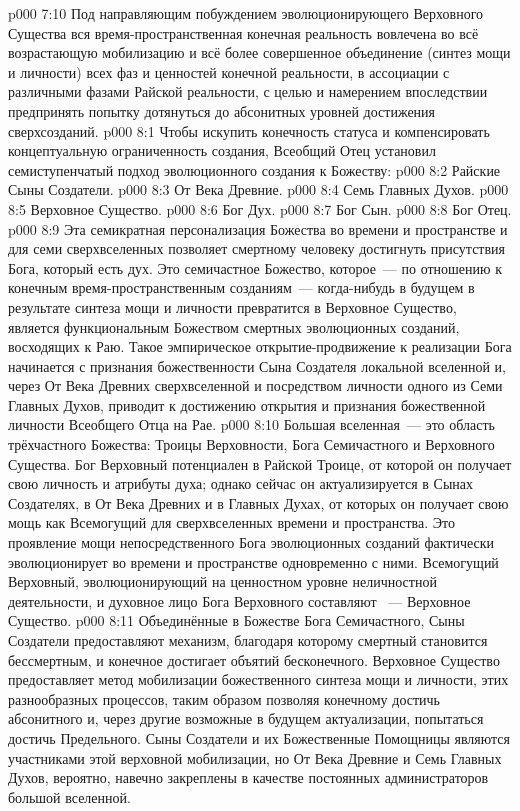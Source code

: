\vs p000 7:10 Под направляющим побуждением эволюционирующего Верховного Существа вся время\hyp{}пространственная конечная реальность вовлечена во всё возрастающую мобилизацию и всё более совершенное объединение (синтез мощи и личности) всех фаз и ценностей конечной реальности, в ассоциации с различными фазами Райской реальности, с целью и намерением впоследствии предпринять попытку дотянуться до абсонитных уровней достижения сверхсозданий.
\vs p000 8:1 Чтобы искупить конечность статуса и компенсировать концептуальную ограниченность создания, Всеобщий Отец установил семиступенчатый подход эволюционного создания к Божеству:
\vs p000 8:2 Райские Сыны Создатели.
\vs p000 8:3 От Века Древние.
\vs p000 8:4 Семь Главных Духов.
\vs p000 8:5 Верховное Существо.
\vs p000 8:6 Бог Дух.
\vs p000 8:7 Бог Сын.
\vs p000 8:8 Бог Отец.
\vs p000 8:9 \pc Эта семикратная персонализация Божества во времени и пространстве и для семи сверхвселенных позволяет смертному человеку достигнуть присутствия Бога, который есть дух. Это семичастное Божество, которое~--- по отношению к конечным время\hyp{}пространственным созданиям~--- когда\hyp{}нибудь в будущем в результате синтеза мощи и личности превратится в Верховное Существо, является функциональным Божеством смертных эволюционных созданий, восходящих к Раю. Такое эмпирическое открытие\hyp{}продвижение к реализации Бога начинается с признания божественности Сына Создателя локальной вселенной и, через От Века Древних сверхвселенной и посредством личности одного из Семи Главных Духов, приводит к достижению открытия и признания божественной личности Всеобщего Отца на Рае.
\vs p000 8:10 \pc Большая вселенная~--- это область трёхчастного Божества: Троицы Верховности, Бога Семичастного и Верховного Существа. Бог Верховный потенциален в Райской Троице, от которой он получает свою личность и атрибуты духа; однако сейчас он актуализируется в Сынах Создателях, в От Века Древних и в Главных Духах, от которых он получает свою мощь как Всемогущий для сверхвселенных времени и пространства. Это проявление мощи непосредственного Бога эволюционных созданий фактически эволюционирует во времени и пространстве одновременно с ними. Всемогущий Верховный, эволюционирующий на ценностном уровне неличностной деятельности, и духовное лицо Бога Верховного составляют ~--- Верховное Существо.
\vs p000 8:11 Объединённые в Божестве Бога Семичастного, Сыны Создатели предоставляют механизм, благодаря которому смертный становится бессмертным, и конечное достигает объятий бесконечного. Верховное Существо предоставляет метод мобилизации божественного синтеза мощи и личности,  этих разнообразных процессов, таким образом позволяя конечному достичь абсонитного и, через другие возможные в будущем актуализации, попытаться достичь Предельного. Сыны Создатели и их Божественные Помощницы являются участниками этой верховной мобилизации, но От Века Древние и Семь Главных Духов, вероятно, навечно закреплены в качестве постоянных администраторов большой вселенной.
